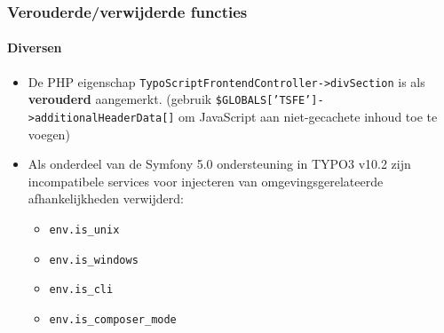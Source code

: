 \begin{frame}[fragile]
	\frametitle{Verouderde/verwijderde functies}
	\framesubtitle{Diversen}

	\lstset{basicstyle=\tiny\ttfamily}

	\begin{itemize}

		\item De PHP eigenschap \texttt{TypoScriptFrontendController->divSection} is als \textbf{verouderd} aangemerkt.\newline
			\smaller
				(gebruik \texttt{\$GLOBALS['TSFE']->additionalHeaderData[]} om JavaScript aan niet-gecachete inhoud toe te voegen)
			\normalsize

		\item Als onderdeel van de Symfony 5.0 ondersteuning in TYPO3 v10.2 zijn incompatibele services voor injecteren van
			omgevingsgerelateerde afhankelijkheden verwijderd:

			\begin{itemize}
				\item \texttt{env.is\_unix}
				\item \texttt{env.is\_windows}
				\item \texttt{env.is\_cli}
				\item \texttt{env.is\_composer\_mode}
			\end{itemize}

	\end{itemize}

\end{frame}

